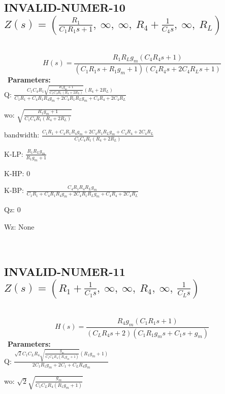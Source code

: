 \documentclass{article}
\begin{document}
\subsection{INVALID-NUMER-10 $Z(s) = \left( \frac{R_{1}}{C_{1} R_{1} s + 1}, \  \infty, \  \infty, \  R_{4} + \frac{1}{C_{4} s}, \  \infty, \  R_{L}\right)$ } \ 
\textbf{\[H(s) = \frac{R_{1} R_{L} g_{m} \left(C_{4} R_{4} s + 1\right)}{\left(C_{1} R_{1} s + R_{1} g_{m} + 1\right) \left(C_{4} R_{4} s + 2 C_{4} R_{L} s + 1\right)}\] } \ 
\textbf{Parameters:}\\ 

Q: $\frac{C_{1} C_{4} R_{1} \sqrt{\frac{R_{1} g_{m} + 1}{C_{1} C_{4} R_{1} \left(R_{4} + 2 R_{L}\right)}} \left(R_{4} + 2 R_{L}\right)}{C_{1} R_{1} + C_{4} R_{1} R_{4} g_{m} + 2 C_{4} R_{1} R_{L} g_{m} + C_{4} R_{4} + 2 C_{4} R_{L}}$\ 

wo: $\sqrt{\frac{R_{1} g_{m} + 1}{C_{1} C_{4} R_{1} \left(R_{4} + 2 R_{L}\right)}}$\ 

bandwidth: $\frac{C_{1} R_{1} + C_{4} R_{1} R_{4} g_{m} + 2 C_{4} R_{1} R_{L} g_{m} + C_{4} R_{4} + 2 C_{4} R_{L}}{C_{1} C_{4} R_{1} \left(R_{4} + 2 R_{L}\right)}$\ 

K-LP: $\frac{R_{1} R_{L} g_{m}}{R_{1} g_{m} + 1}$\ 

K-HP: $0$\ 

K-BP: $\frac{C_{4} R_{1} R_{4} R_{L} g_{m}}{C_{1} R_{1} + C_{4} R_{1} R_{4} g_{m} + 2 C_{4} R_{1} R_{L} g_{m} + C_{4} R_{4} + 2 C_{4} R_{L}}$\ 

Qz: $0$\ 

Wz: $\text{None}$\ 

\ 

\subsection{INVALID-NUMER-11 $Z(s) = \left( R_{1} + \frac{1}{C_{1} s}, \  \infty, \  \infty, \  R_{4}, \  \infty, \  \frac{1}{C_{L} s}\right)$ } \ 
\textbf{\[H(s) = \frac{R_{4} g_{m} \left(C_{1} R_{1} s + 1\right)}{\left(C_{L} R_{4} s + 2\right) \left(C_{1} R_{1} g_{m} s + C_{1} s + g_{m}\right)}\] } \ 
\textbf{Parameters:}\\ 

Q: $\frac{\sqrt{2} C_{1} C_{L} R_{4} \sqrt{\frac{g_{m}}{C_{1} C_{L} R_{4} \left(R_{1} g_{m} + 1\right)}} \left(R_{1} g_{m} + 1\right)}{2 C_{1} R_{1} g_{m} + 2 C_{1} + C_{L} R_{4} g_{m}}$\ 

wo: $\sqrt{2} \sqrt{\frac{g_{m}}{C_{1} C_{L} R_{4} \left(R_{1} g_{m} + 1\right)}}$\ 
\end{document}
